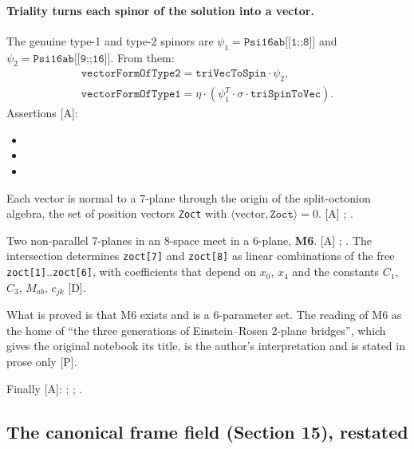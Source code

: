 \paragraph{Triality turns each spinor of the solution into a vector.} The genuine type-1 and
type-2 spinors are $\psi_1=\texttt{Psi16ab[[1;;8]]}$ and $\psi_2=\texttt{Psi16ab[[9;;16]]}$. From
them:
\begin{gather}
  \texttt{vectorFormOfType2}=\texttt{triVecToSpin}\cdot\psi_2,\\
  \texttt{vectorFormOfType1}=\eta\cdot(\psi_1^{T}\cdot\sigma\cdot\texttt{triSpinToVec}).
\end{gather}
Assertions [A]:
\begin{itemize}
  \item {}
  \item {}
  \item {}
\end{itemize}
Each vector is normal to a 7-plane through the origin of the split-octonion algebra, the set of
position vectors \texttt{Zoct} with $\langle\text{vector},\texttt{Zoct}\rangle=0$. [A]
;
.

Two non-parallel 7-planes in an 8-space meet in a 6-plane, \textbf{M6}. [A]
; . The intersection
determines \texttt{zoct[7]} and \texttt{zoct[8]} as linear combinations of the free
\texttt{zoct[1]}..\texttt{zoct[6]}, with coefficients that depend on $x_0$, $x_4$ and the
constants $C_1$, $C_3$, $M_{ab}$, $c_{jk}$ [D].

What is proved is that M6 exists and is a 6-parameter set. The reading of M6 as the home of
``the three generations of Einstein--Rosen 2-plane bridges'', which gives the original notebook
its title, is the author's interpretation and is stated in prose only [P].

Finally [A]: ;
;
.

\subsection{The canonical frame field (Section 15), restated}
\label{fnd:frame}\label{sec:2.11}

